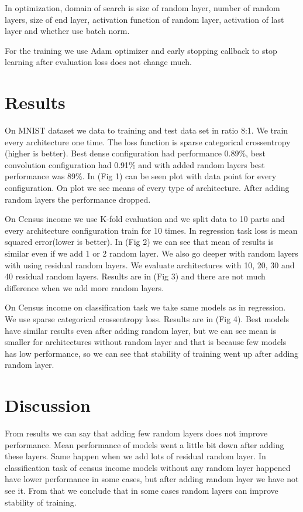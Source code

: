 \documentclass[]{article}
\begin{document}
\begin{multicols}{2}
	In optimization, domain of search is size of random layer, number of random layers, size of end layer, activation function of random layer, activation of last layer and whether use batch norm.	
	
	For the training we use Adam optimizer and early stopping callback to stop learning after evaluation loss does not change much.
	
	\section{Results}
	On MNIST dataset we data to training and test data set in ratio 8:1. We train every architecture one time. The loss function is sparse categorical crossentropy (higher is better). Best dense configuration had performance 0.89\%, best convolution configuration had 0.91\% and with added random layers best performance was 89\%. In (Fig 1) can be seen plot with data point for every configuration. On plot we see means of every type of architecture. After adding random layers the performance dropped.
	
	On Census income we use K-fold evaluation and we split data to 10 parts and every architecture configuration train for 10 times. In regression task loss is mean squared error(lower is better). In (Fig 2) we can see that mean of results is similar even if we add 1 or 2 random layer. We also go deeper with random layers with using residual random layers. We evaluate architectures with 10, 20, 30 and 40 residual random layers. Results are in (Fig 3) and there are not much difference when we add more random layers.
	
	On Census income on classification task we take same models as in regression. We use sparse categorical crossentropy loss. Results are in (Fig 4). Best models have similar results even after adding random layer, but we can see mean is smaller for architectures without random layer and that is because few models has low performance, so we can see that stability of training went up after adding random layer.	
	
	\section{Discussion}
	From results we can say that adding few random layers does not improve performance. Mean performance of models went a little bit down after adding these layers. Same happen when we add lots of residual random layer. In classification task of census income models without any random layer happened have lower performance in some cases, but after adding random layer we have not see it. From that we conclude that in some cases random layers can improve stability of training.
	

\end{multicols}
\end{document}
